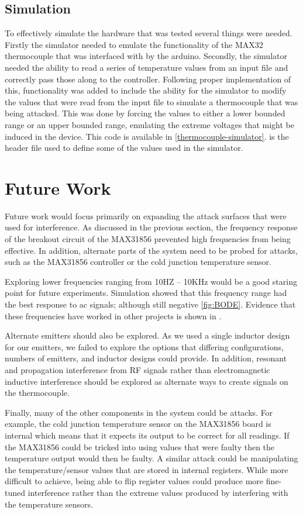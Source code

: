 \subsection{Simulation}
To effectively simulate the hardware that was tested several things were needed. Firstly the simulator needed to emulate the functionality of the MAX32 thermocouple that was interfaced with by the arduino. Secondly, the simulator needed the ability to read a series of temperature values from an input file and correctly pass those along to the controller. Following proper implementation of this, functionality was added to include the ability for the simulator to modify the values that were read from the input file to simulate a thermocouple that was being attacked. This was done by forcing the values to either a lower bounded range or an upper bounded range, emulating the extreme voltages that might be induced in the device. This code is available in \cref{thermocouple-simulator}.  is the header file used to define some of the values used in the simulator.

\section{Future Work}\label{fut}
Future work would focus primarily on expanding the attack surfaces that were used for interference. As discussed in the previous section, the frequency response of the breakout circuit of the MAX31856 prevented high frequencies from being effective. In addition, alternate parts of the system need to be probed for attacks, such as the MAX31856 controller or the cold junction temperature sensor.

Exploring lower frequencies ranging from 10HZ – 10KHz would be a good staring point for future experiments. Simulation showed that this frequency range had the best response to \ac{ac} signals; although still negative \cref{fig:BODE}. Evidence that these frequencies have worked in other projects is shown in \cite{Chakraborty82,Smalcerz2013}.

Alternate emitters should also be explored. As we used a single inductor design for our emitters, we failed to explore the options that differing configurations, numbers of emitters, and inductor designs could provide. In addition, resonant and propagation interference from RF signals rather than electromagnetic inductive interference should be explored as alternate ways to create signals on the thermocouple.

Finally, many of the other components in the system could be attacks. For example, the cold junction temperature sensor on the MAX31856 board is internal which means that it expects its output to be correct for all readings. If the MAX31856 could be tricked into using values that were faulty then the temperature output would then be faulty. A similar attack could be manipulating the temperature/sensor values that are stored in internal registers. While more difficult to achieve, being able to flip register values could produce more fine-tuned interference rather than the extreme values produced by interfering with the temperature sensors.
